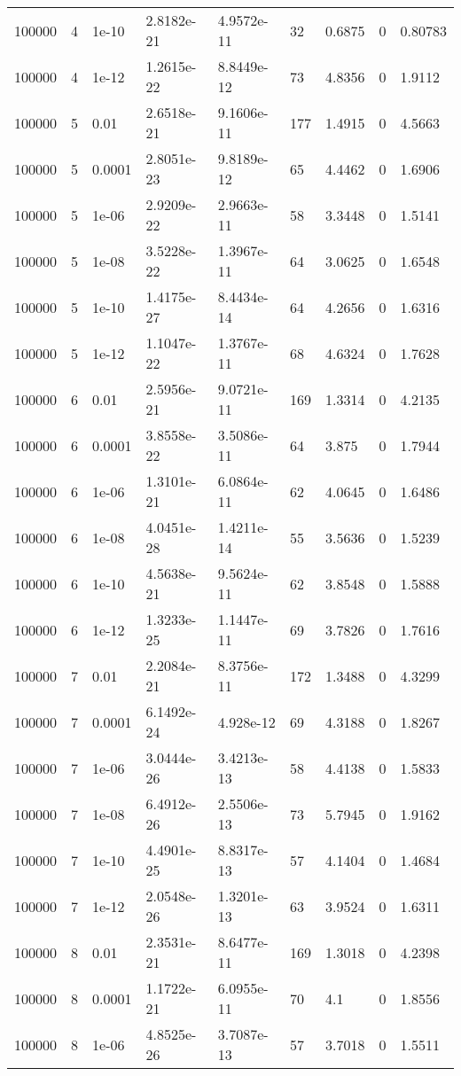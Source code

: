 \begin{tabular}{lllllllll}
100000 & 4 & 1e-10 & 2.8182e-21 & 4.9572e-11 & 32 & 0.6875 & 0 & 0.80783 \\ 
100000 & 4 & 1e-12 & 1.2615e-22 & 8.8449e-12 & 73 & 4.8356 & 0 & 1.9112 \\ 
100000 & 5 & 0.01 & 2.6518e-21 & 9.1606e-11 & 177 & 1.4915 & 0 & 4.5663 \\ 
100000 & 5 & 0.0001 & 2.8051e-23 & 9.8189e-12 & 65 & 4.4462 & 0 & 1.6906 \\ 
100000 & 5 & 1e-06 & 2.9209e-22 & 2.9663e-11 & 58 & 3.3448 & 0 & 1.5141 \\ 
100000 & 5 & 1e-08 & 3.5228e-22 & 1.3967e-11 & 64 & 3.0625 & 0 & 1.6548 \\ 
100000 & 5 & 1e-10 & 1.4175e-27 & 8.4434e-14 & 64 & 4.2656 & 0 & 1.6316 \\ 
100000 & 5 & 1e-12 & 1.1047e-22 & 1.3767e-11 & 68 & 4.6324 & 0 & 1.7628 \\ 
100000 & 6 & 0.01 & 2.5956e-21 & 9.0721e-11 & 169 & 1.3314 & 0 & 4.2135 \\ 
100000 & 6 & 0.0001 & 3.8558e-22 & 3.5086e-11 & 64 & 3.875 & 0 & 1.7944 \\ 
100000 & 6 & 1e-06 & 1.3101e-21 & 6.0864e-11 & 62 & 4.0645 & 0 & 1.6486 \\ 
100000 & 6 & 1e-08 & 4.0451e-28 & 1.4211e-14 & 55 & 3.5636 & 0 & 1.5239 \\ 
100000 & 6 & 1e-10 & 4.5638e-21 & 9.5624e-11 & 62 & 3.8548 & 0 & 1.5888 \\ 
100000 & 6 & 1e-12 & 1.3233e-25 & 1.1447e-11 & 69 & 3.7826 & 0 & 1.7616 \\ 
100000 & 7 & 0.01 & 2.2084e-21 & 8.3756e-11 & 172 & 1.3488 & 0 & 4.3299 \\ 
100000 & 7 & 0.0001 & 6.1492e-24 & 4.928e-12 & 69 & 4.3188 & 0 & 1.8267 \\ 
100000 & 7 & 1e-06 & 3.0444e-26 & 3.4213e-13 & 58 & 4.4138 & 0 & 1.5833 \\ 
100000 & 7 & 1e-08 & 6.4912e-26 & 2.5506e-13 & 73 & 5.7945 & 0 & 1.9162 \\ 
100000 & 7 & 1e-10 & 4.4901e-25 & 8.8317e-13 & 57 & 4.1404 & 0 & 1.4684 \\ 
100000 & 7 & 1e-12 & 2.0548e-26 & 1.3201e-13 & 63 & 3.9524 & 0 & 1.6311 \\ 
100000 & 8 & 0.01 & 2.3531e-21 & 8.6477e-11 & 169 & 1.3018 & 0 & 4.2398 \\ 
100000 & 8 & 0.0001 & 1.1722e-21 & 6.0955e-11 & 70 & 4.1 & 0 & 1.8556 \\ 
100000 & 8 & 1e-06 & 4.8525e-26 & 3.7087e-13 & 57 & 3.7018 & 0 & 1.5511 \\ 

\end{tabular}
